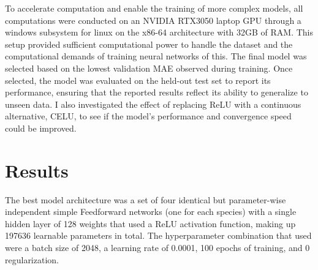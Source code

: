 \documentclass[11pt, twocolumn]{article}
\begin{document}
To accelerate computation and enable the training of more complex models, all computations were conducted on an NVIDIA RTX3050 laptop GPU through a windows subsystem for linux on the x86-64 architecture with 32GB of RAM. This setup provided sufficient computational power to handle the dataset and the computational demands of training neural networks of this. The final model was selected based on the lowest validation MAE observed during training. Once selected, the model was evaluated on the held-out test set to report its performance, ensuring that the reported results reflect its ability to generalize to unseen data. I also investigated the effect of replacing ReLU with a continuous alternative, CELU, to see if the model's performance and convergence speed could be improved.

\section{Results}

The best model architecture was a set of four identical but parameter-wise independent simple Feedforward networks (one for each species) with a single hidden layer of 128 weights that used a ReLU activation function, making up 197636 learnable parameters in total. The hyperparameter combination that used were a batch size of 2048, a learning rate of 0.0001, 100 epochs of training, and 0 regularization.
\end{document}

